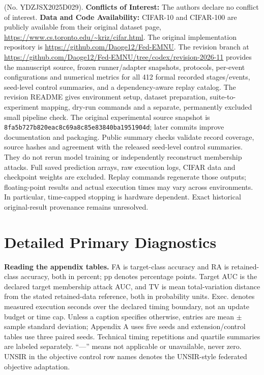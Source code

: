 \documentclass[software,article,submit,moreauthors]{Definitions/mdpi}
\begin{document}
(No. YDZJSX2025D029).
\vspace{6pt}
\noindent\textbf{Conflicts of Interest:} The authors declare no conflict of interest.
\vspace{6pt}
\noindent\textbf{Data and Code Availability:} CIFAR-10 and CIFAR-100 are publicly available
from their original dataset page, \url{https://www.cs.toronto.edu/~kriz/cifar.html}.
The original implementation repository is
\url{https://github.com/Daoge12/Fed-EMNU}. The revision branch at
\url{https://github.com/Daoge12/Fed-EMNU/tree/codex/revision-2026-11}
provides the manuscript source, frozen runner/adapter snapshots, protocols,
per-event configurations and numerical metrics for all 412 formal recorded
stages/events, seed-level control summaries, and a dependency-aware replay
catalog. The revision README gives environment setup, dataset preparation,
suite-to-experiment mapping, dry-run commands and a separate, permanently
excluded small pipeline check. The original experimental source snapshot is
\texttt{8fa5b727b820eac8c69a8c85e83840ba1951904d}; later commits improve
documentation and packaging. Public summary checks validate record coverage,
source hashes and agreement with the released seed-level control summaries.
They do not rerun model training or independently reconstruct membership attacks.
Full saved prediction arrays, raw execution logs, CIFAR data and checkpoint
weights are excluded. Replay commands regenerate those outputs; floating-point
results and actual execution times may vary across environments. In particular,
time-capped stopping is hardware dependent. Exact historical original-result
provenance remains unresolved.

\clearpage
\appendixstart
\appendix
\section{Detailed Primary Diagnostics}
\label{sec:core-details}
\noindent\textbf{Reading the appendix tables.}
FA is target-class accuracy and RA is retained-class accuracy, both in percent;
pp denotes percentage points. Target AUC is the declared target membership
attack AUC, and TV is mean total-variation distance from the stated retained-data
reference, both in probability units. Exec. denotes measured execution seconds
over the declared timing boundary, not an update budget or time cap. Unless a
caption specifies otherwise, entries are mean $\pm$ sample standard deviation;
Appendix A uses five seeds and extension/control tables use three paired seeds.
Technical timing repetitions and quartile summaries are labeled separately.
``---'' means not applicable or unavailable, never zero. UNSIR in the objective
control row names denotes the UNSIR-style federated objective adaptation.
\par
\end{document}
